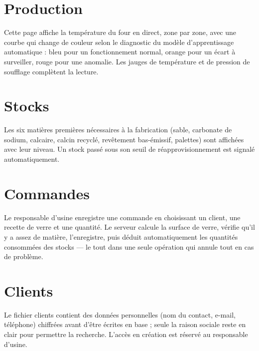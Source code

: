 \documentclass[11pt,a4paper]{report}
\begin{document}
\section{Production}
Cette page affiche la température du four en direct, zone par zone, avec une
courbe qui change de couleur selon le diagnostic du modèle d'apprentissage
automatique : bleu pour un fonctionnement normal, orange pour un écart à
surveiller, rouge pour une anomalie. Les jauges de température et de pression de
soufflage complètent la lecture.


\section{Stocks}
Les six matières premières nécessaires à la fabrication (sable, carbonate de
sodium, calcaire, calcin recyclé, revêtement bas-émissif, palettes) sont
affichées avec leur niveau. Un stock passé sous son seuil de réapprovisionnement
est signalé automatiquement.


\section{Commandes}
Le responsable d'usine enregistre une commande en choisissant un client, une
recette de verre et une quantité. Le serveur calcule la surface de verre, vérifie
qu'il y a assez de matière, l'enregistre, puis déduit automatiquement les
quantités consommées des stocks — le tout dans une seule opération qui annule
tout en cas de problème.


\section{Clients}
Le fichier clients contient des données personnelles (nom du contact, e-mail,
téléphone) chiffrées avant d'être écrites en base ; seule la raison sociale
reste en clair pour permettre la recherche. L'accès en création est réservé au
responsable d'usine.

\end{document}
